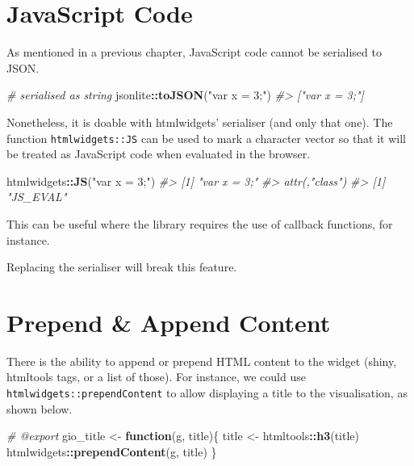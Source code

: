 \documentclass[
]{krantz}
\makeatletter
\newenvironment{Shaded}{\begin{snugshade}}{\end{snugshade}}
\newcommand{\CommentTok}[1]{\textcolor[rgb]{0.37,0.37,0.37}{\textit{#1}}}
\newcommand{\ControlFlowTok}[1]{\textcolor[rgb]{0.27,0.27,0.27}{\textbf{#1}}}
\newcommand{\KeywordTok}[1]{\textcolor[rgb]{0.27,0.27,0.27}{\textbf{#1}}}
\newcommand{\NormalTok}[1]{#1}
\newcommand{\OperatorTok}[1]{\textcolor[rgb]{0.43,0.43,0.43}{\textbf{#1}}}
\newcommand{\StringTok}[1]{\textcolor[rgb]{0.5,0.5,0.5}{#1}}
\newenvironment{kframe}{%
\medskip{}
\setlength{\fboxsep}{.8em}
 \def\at@end@of@kframe{}%
 \ifinner\ifhmode%
  \def\at@end@of@kframe{\end{minipage}}%
  \begin{minipage}{\columnwidth}%
 \fi\fi%
 \def\FrameCommand##1{\hskip\@totalleftmargin \hskip-\fboxsep
 \colorbox{shadecolor}{##1}\hskip-\fboxsep
     \hskip-\linewidth \hskip-\@totalleftmargin \hskip\columnwidth}%
 \MakeFramed {\advance\hsize-\width
   \@totalleftmargin\z@ \linewidth\hsize
   \@setminipage}}%
 {\par\unskip\endMakeFramed%
 \at@end@of@kframe}
\renewenvironment{Shaded}{\begin{kframe}}{\end{kframe}}
\newenvironment{rmdblock}[1]
  {
  \begin{itemize}
  \renewcommand{\labelitemi}{
    \raisebox{-.7\height}[0pt][0pt]{
      {\setkeys{Gin}{width=3em,keepaspectratio}\texttt{[image: images/\#1]}}
    }
  }
  \setlength{\fboxsep}{1em}
  \begin{kframe}
  \item
  }
  {
  \end{kframe}
  \end{itemize}
  }
\newenvironment{rmdnote}
  {\begin{rmdblock}{note}}
  {\end{rmdblock}}
\makeatother
\begin{document}
\hypertarget{widgets-adv-js}{%
\section{JavaScript Code}\label{widgets-adv-js}}

As mentioned in a previous chapter, JavaScript code cannot be serialised to JSON.

\begin{Shaded}
\begin{Highlighting}[]
\CommentTok{\# serialised as string}
\NormalTok{jsonlite}\OperatorTok{::}\KeywordTok{toJSON}\NormalTok{(}\StringTok{"var x = 3;"}\NormalTok{)}
\CommentTok{\#> ["var x = 3;"]}
\end{Highlighting}
\end{Shaded}

Nonetheless, it is doable with htmlwidgets' serialiser (and only that one). The function \texttt{htmlwidgets::JS} can be used to mark a character vector so that it will be treated as JavaScript code when evaluated in the browser.

\begin{Shaded}
\begin{Highlighting}[]
\NormalTok{htmlwidgets}\OperatorTok{::}\KeywordTok{JS}\NormalTok{(}\StringTok{"var x = 3;"}\NormalTok{)  }
\CommentTok{\#> [1] "var x = 3;"}
\CommentTok{\#> attr(,"class")}
\CommentTok{\#> [1] "JS\_EVAL"}
\end{Highlighting}
\end{Shaded}

This can be useful where the library requires the use of callback functions, for instance.

\begin{rmdnote}
Replacing the serialiser will break this feature.
\end{rmdnote}

\hypertarget{widgets-adv-prepend-append}{%
\section{Prepend \& Append Content}\label{widgets-adv-prepend-append}}

There is the ability to append or prepend HTML content to the widget (shiny, htmltools tags, or a list of those). For instance, we could use \texttt{htmlwidgets::prependContent} to allow displaying a title to the visualisation, as shown below.

\begin{Shaded}
\begin{Highlighting}[]
\CommentTok{\#\textquotesingle{} @export}
\NormalTok{gio\_title <{-}}\StringTok{ }\ControlFlowTok{function}\NormalTok{(g, title)\{}
\NormalTok{  title <{-}}\StringTok{ }\NormalTok{htmltools}\OperatorTok{::}\KeywordTok{h3}\NormalTok{(title)}
\NormalTok{  htmlwidgets}\OperatorTok{::}\KeywordTok{prependContent}\NormalTok{(g, title)}
\NormalTok{\}}
\end{Highlighting}
\end{Shaded}
\end{document}
